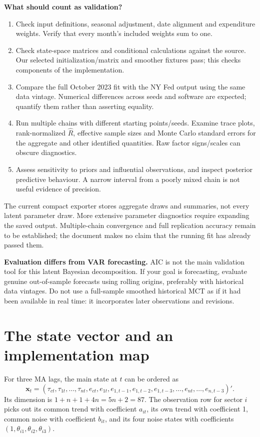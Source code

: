 \documentclass[11pt,a4paper]{article}
\begin{document}
\textbf{What should count as validation?}
\begin{enumerate}
\item Check input definitions, seasonal adjustment, date alignment and expenditure weights. Verify that every month's included weights sum to one.
\item Check state-space matrices and conditional calculations against the source. Our selected initialization/matrix and smoother fixtures pass; this checks components of the implementation.
\item Compare the full October 2023 fit with the NY Fed output using the same data vintage. Numerical differences across seeds and software are expected; quantify them rather than asserting equality.
\item Run multiple chains with different starting points/seeds. Examine trace plots, rank-normalized $\widehat R$, effective sample sizes and Monte Carlo standard errors for the aggregate and other identified quantities. Raw factor signs/scales can obscure diagnostics.
\item Assess sensitivity to priors and influential observations, and inspect posterior predictive behaviour. A narrow interval from a poorly mixed chain is not useful evidence of precision.
\end{enumerate}
The current compact exporter stores aggregate draws and summaries, not every latent parameter draw. More extensive parameter diagnostics require expanding the saved output. Multiple-chain convergence and full replication accuracy remain to be established; the document makes no claim that the running fit has already passed them.

\textbf{Evaluation differs from VAR forecasting.} AIC is not the main validation tool for this latent Bayesian decomposition. If your goal is forecasting, evaluate genuine out-of-sample forecasts using rolling origins, preferably with historical data vintages. Do not use a full-sample smoothed historical MCT as if it had been available in real time: it incorporates later observations and revisions.

\newpage
\appendix
\section{The state vector and an implementation map}
For three MA lags, the main state at $t$ can be ordered as
\[
\mathbf x_t=(\tau_{ct},\tau_{1t},\ldots,\tau_{nt},e_{ct},
e_{1t},e_{1,t-1},e_{1,t-2},e_{1,t-3},\ldots,e_{nt},\ldots,e_{n,t-3})'.
\]
Its dimension is $1+n+1+4n=5n+2=87$. The observation row for sector $i$ picks out its common trend with coefficient $a_{it}$, its own trend with coefficient 1, common noise with coefficient $b_{it}$, and its four noise states with coefficients $(1,\theta_{i1},\theta_{i2},\theta_{i3})$.
\end{document}

